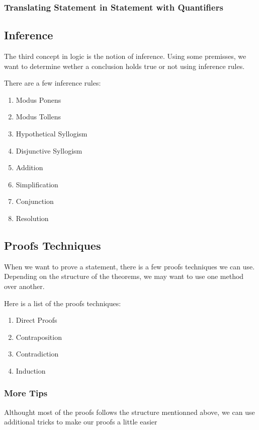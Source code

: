\documentclass{article}
\begin{document}
\subsubsection{Translating Statement in Statement with Quantifiers}

\subsection{Inference}

The third concept in logic is the notion of inference. Using some premisses,
we want to determine wether a conclusion holds true or not using inference rules.

There are a few inference rules:

    \begin{enumerate}
	\item Modus Ponens
	\item Modus Tollens
	\item Hypothetical Syllogism
	\item Disjunctive Syllogism
	\item Addition
	\item Simplification
	\item Conjunction
	\item Resolution
    \end{enumerate}


\subsection{Proofs Techniques}

When we want to prove a statement, there is a few proofs techniques we can use.
Depending on the structure of the theorems, we may want to use one method over
another.

Here is a list of the proofs techniques:

    \begin{enumerate}
	\item Direct Proofs
	\item Contraposition
	\item Contradiction
	\item Induction
    \end{enumerate}

\subsubsection{More Tips}

Althought most of the proofs follows the structure mentionned above, we can use
additional tricks to make our proofs a little easier
\end{document}
